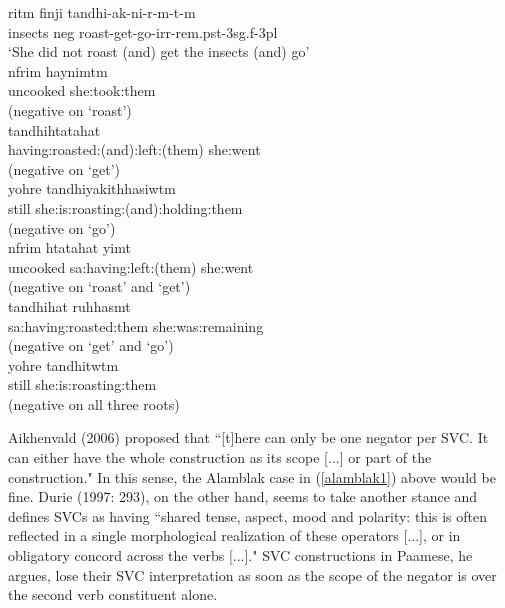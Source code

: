 \pex \label{alamblak1}
\a
\gll ritm finji tandhi-ak-ni-r-m-t-m \\
insects \acs{neg} roast-get-go-\acs{irr}-\acs{rem}.\acs{pst}-\acs{3}\acs{sg}.\acs{f}-\acs{3}\acs{pl} \\
\glft `She did not roast (and) get the insects (and) go' \\ 
\z
\a \label{ala-1}
\gla n\textipa{\textbari}frim haynimtm \\
uncooked she:took:them \\
\glft (negative on `roast') \\ 
\z
\a
\gla tandhih\textipa{\textbari}tatahat \\
having:roasted:(and):left:(them) she:went \\
\glft (negative on `get') \\ 
\z
\a
\gla yohre tandhiyakithhasiwtm \\
still she:is:roasting:(and):holding:them \\
\glft (negative on `go') \\ 
\z
\a
\gla n\textipa{\textbari}frim h\textipa{\textbari}tatahat yimt \\
uncooked \acs{sa}:having:left:(them) she:went \\
\glft (negative on `roast' and `get') \\ 
\z
\a
\gla tandhihat ruhhasmt \\
\acs{sa}:having:roasted:them she:was:remaining \\
\glft (negative on `get' and `go') \\ 
\z
\a \label{ala-2}
\gla yohre tandhitwtm \\ 
still she:is:roasting:them \\
\glft (negative on all three roots) \\ 
\z
\xe

Aikhenvald (2006) proposed that ``[t]here can only be one negator per SVC. It can either have the whole construction as its scope [...] or part of the construction." In this sense, the Alamblak case in (\ref{alamblak1}) above would be fine. Durie (1997: 293), on the other hand, seems to take another stance and defines SVCs as having ``shared tense, aspect, mood and polarity: this is often reflected in a single morphological realization of these operators [...], or in obligatory concord across the verbs [...]." SVC constructions in Paamese, he argues, lose their SVC interpretation as soon as the scope of the negator is over the second verb constituent alone.

